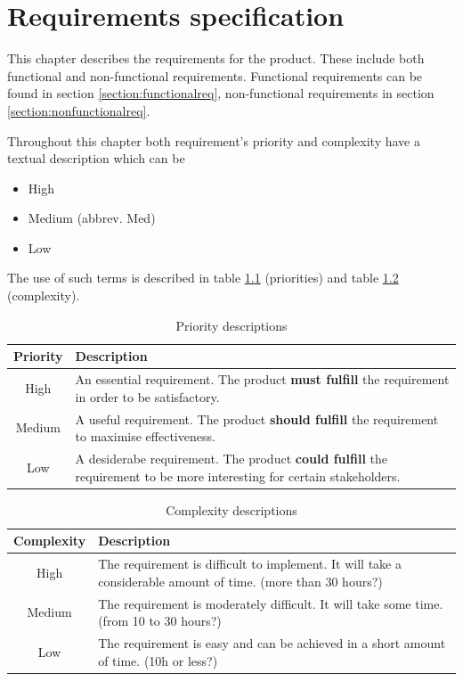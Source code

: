 \chapter{Requirements specification}

\label{ch:requirements}

This chapter describes the requirements for the product. These include both functional and non-functional requirements.
Functional requirements can be found in section \ref{section:functionalreq},
non-functional requirements in section \ref{section:nonfunctionalreq}.

Throughout this chapter both requirement's priority and complexity have a textual description which can be
\begin{itemize}
\item High
\item Medium (abbrev. Med)
\item Low
\end{itemize}

The use of such terms is described in table \ref{table:priorities} (priorities) and table \ref{table:complexity} (complexity).

\begin{table}[h]
\begin{center}
\begin{tabular}{ | c | p{12.5cm} | }
  \hline
  Priority & Description \\
  \hline\noalign{\smallskip}\noalign{\smallskip}\hline
  High & An essential requirement. The product \textbf{must fulfill} the requirement in order to be satisfactory. \\
  Medium & A useful requirement. The product \textbf{should fulfill} the requirement to maximise effectiveness. \\
  Low & A desiderabe requirement. The product \textbf{could fulfill} the requirement to be more interesting for certain stakeholders. \\
  \hline
\end{tabular}
\end{center}
\caption{Priority descriptions}
\label{table:priorities}
\end{table}

\begin{table}[h]
\begin{center}
\begin{tabular}{ | c | p{12.5cm} | }
  \hline
  Complexity & Description \\
  \hline\noalign{\smallskip}\noalign{\smallskip}\hline
  High & The requirement is difficult to implement. It will take a considerable amount of time. (more than 30 hours?) \\
  Medium & The requirement is moderately difficult. It will take some time. (from 10 to 30 hours?) \\
  Low & The requirement is easy and can be achieved in a short amount of time. (10h or less?) \\
  \hline
\end{tabular}
\end{center}
\caption{Complexity descriptions}
\label{table:complexity}
\end{table}

